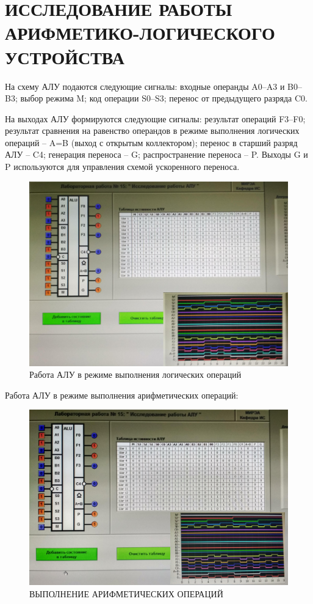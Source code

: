 \section{ИССЛЕДОВАНИЕ РАБОТЫ АРИФМЕТИКО-ЛОГИЧЕСКОГО	УСТРОЙСТВА}

На схему АЛУ подаются следующие сигналы: входные операнды
A0–A3 и B0–B3; выбор режима M; код операции S0–S3; перенос от предыдущего разряда C0.

На выходах АЛУ формируются следующие сигналы: результат операций F3–F0; результат сравнения на равенство операндов в режиме выполнения логических операций – A=B (выход с открытым коллектором);
перенос в старший разряд АЛУ – C4; генерация переноса – G; распространение переноса – P. Выходы G и P используются для управления схемой
ускоренного переноса.

\begin{figure}[H]
	\centering
	\includegraphics[width=0.95\linewidth]{imgs/15/1}
	\caption{Работа АЛУ в режиме выполнения логических операций}
	\label{fig:15_1}
\end{figure}

Работа АЛУ в режиме выполнения арифметических операций:

\begin{figure}[H]
	\centering
	\includegraphics[width=0.95\linewidth]{imgs/15/2}
	\caption{ВЫПОЛНЕНИЕ АРИФМЕТИЧЕСКИХ ОПЕРАЦИЙ}
	\label{fig:15_2}
\end{figure}

